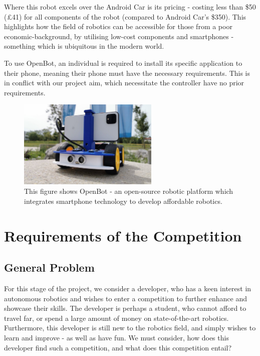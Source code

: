 \documentclass{l4proj}
\begin{document}
Where this robot excels over the Android Car is its pricing - costing less than \$50 (£41) for all components of the robot (compared to Android Car’s \$350). This highlights how the field of robotics can be accessible for those from a poor economic-background, by utilising low-cost components and smartphones - something which is ubiquitous in the modern world.

To use OpenBot, an individual is required to install its specific application to their phone, meaning their phone must have the necessary requirements. This is in conflict with our project aim, which necessitate the controller have no prior requirements.

\begin{figure}[!ht]
    \centering
    \includegraphics[width=0.60\textwidth]{images/openbot.pdf}
    \caption{This figure shows OpenBot - an open-source robotic platform which integrates smartphone technology to develop affordable robotics.}
    \label{fig:openbot}
\end{figure}


\chapter{Requirements of the Competition}
\section{General Problem}\label{sec:comp:general-problem}
For this stage of the project, we consider a developer, who has a keen interest in autonomous robotics and wishes to enter a competition to further enhance and showcase their skills. The developer is perhaps a student, who cannot afford to travel far, or spend a large amount of money on state-of-the-art robotics. Furthermore, this developer is still new to the robotics field, and simply wishes to learn and improve - as well as have fun. We must consider, how does this developer find such a competition, and what does this competition entail?
\end{document}
